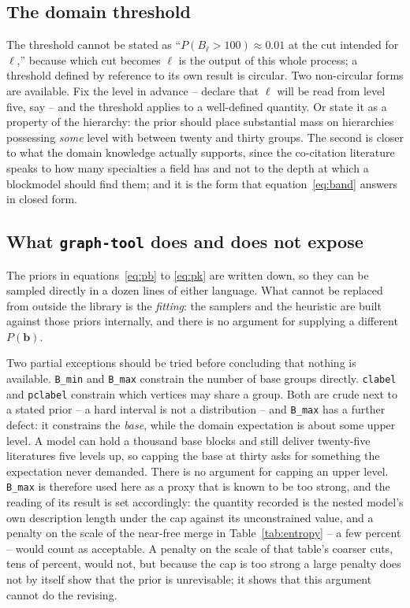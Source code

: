 \documentclass[11pt]{article}
\newcommand{\code}[1]{\texttt{\small #1}}
\begin{document}
\subsection{The domain threshold}

The threshold cannot be stated as ``$P(B_{\ell} > 100) \approx 0.01$ at the
cut intended for $\ell$,'' because which cut becomes $\ell$ is the output of
this whole process; a threshold defined by reference to its own result is
circular. Two non-circular forms are available. Fix the level in advance --
declare that $\ell$ will be read from level five, say -- and the threshold
applies to a well-defined quantity. Or state it as a property of the
hierarchy: the prior should place substantial mass on hierarchies possessing
\emph{some} level with between twenty and thirty groups. The second is closer
to what the domain knowledge actually supports, since the co-citation
literature speaks to how many specialties a field has and not to the depth at
which a blockmodel should find them; and it is the form that
equation~\eqref{eq:band} answers in closed form.

\subsection{What \code{graph-tool} does and does not expose}

The priors in equations~\eqref{eq:pb} to \eqref{eq:pk} are written down, so
they can be sampled directly in a dozen lines of either language. What cannot
be replaced from outside the library is the \emph{fitting}: the samplers and
the heuristic are built against those priors internally, and there is no
argument for supplying a different $P(\bm{b})$.

Two partial exceptions should be tried before concluding that nothing is
available. \code{B_min} and \code{B_max} constrain the number of base groups
directly. \code{clabel} and \code{pclabel} constrain which vertices may share a
group. Both are crude next to a stated prior -- a hard interval is not a
distribution -- and \code{B_max} has a further defect: it constrains the
\emph{base}, while the domain expectation is about some upper level. A model
can hold a thousand base blocks and still deliver twenty-five literatures five
levels up, so capping the base at thirty asks for something the expectation
never demanded. There is no argument for capping an upper level. \code{B_max}
is therefore used here as a proxy that is known to be too strong, and the
reading of its result is set accordingly: the quantity recorded is the
nested model's own description length under the cap against its unconstrained
value, and a penalty on the scale of the near-free merge in
Table~\ref{tab:entropy} -- a few percent -- would count as acceptable. A
penalty on the scale of that table's coarser cuts, tens of percent, would
not, but because the cap is too strong a large penalty does not by itself
show that the prior is unrevisable; it shows that this argument cannot do the
revising.
\end{document}
